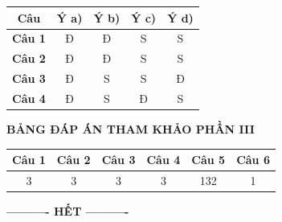 \documentclass[12pt,a4paper]{article}
\begin{document}
\begin{center}
\begin{tabular}{|c|c|c|c|c|}
\hline
\textbf{Câu} & \textbf{Ý a)} & \textbf{Ý b)} & \textbf{Ý c)} & \textbf{Ý d)} \\
\hline
\textbf{Câu 1} & Đ & Đ & S & S \\
\hline
\textbf{Câu 2} & Đ & Đ & S & S \\
\hline
\textbf{Câu 3} & Đ & S & S & Đ \\
\hline
\textbf{Câu 4} & Đ & S & Đ & S \\
\hline
\end{tabular}
\end{center}

\bigskip
\noindent\textbf{\large BẢNG ĐÁP ÁN THAM KHẢO PHẦN III}
\vspace{0.2cm}

\begin{center}
\begin{tabular}{|c|c|c|c|c|c|}
\hline
\textbf{Câu 1} & \textbf{Câu 2} & \textbf{Câu 3} & \textbf{Câu 4} & \textbf{Câu 5} & \textbf{Câu 6} \\
\hline
3 & 3 & 3 & 3 & 132 & 1 \\
\hline
\end{tabular}
\end{center}

\bigskip
\begin{center}
\textbf{---------- HẾT ----------}
\end{center}
\end{document}
